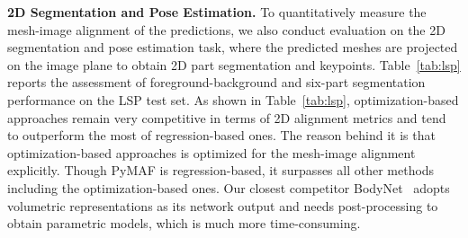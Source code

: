 \documentclass[10pt,twocolumn,letterpaper]{article}
\begin{document}
\textbf{2D Segmentation and Pose Estimation.}
To quantitatively measure the mesh-image alignment of the predictions, we also conduct evaluation on the 2D segmentation and pose estimation task, where the predicted meshes are projected on the image plane to obtain 2D part segmentation and keypoints.
Table~\ref{tab:lsp} reports the assessment of foreground-background and six-part segmentation performance on the LSP test set.
As shown in Table~\ref{tab:lsp}, optimization-based approaches remain very competitive in terms of 2D alignment metrics and tend to outperform the most of regression-based ones.
The reason behind it is that optimization-based approaches is optimized for the mesh-image alignment explicitly.
Though PyMAF is regression-based, it surpasses all other methods including the optimization-based ones.
Our closest competitor BodyNet~\cite{varol2018bodynet} adopts volumetric representations as its network output and needs post-processing to obtain parametric models, which is much more time-consuming.
\end{document}
